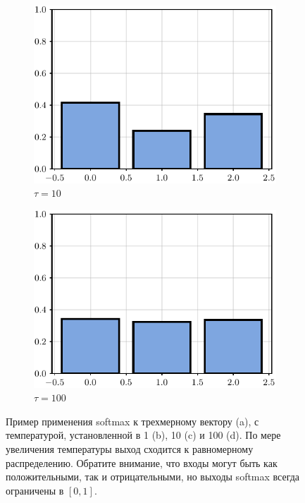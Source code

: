 \begin{figure}[t]
\begin{subfigure}[b]{0.24\textwidth}
    \includegraphics[width=1.0\textwidth]{images/softmax_3.pdf}
    \caption{$\tau=10$}
    \end{subfigure}
    \hfill
    \begin{subfigure}[b]{0.24\textwidth}
    \includegraphics[width=1.0\textwidth]{images/softmax_4.pdf}
    \caption{$\tau=100$}
    \end{subfigure}
    \hfill
    \caption{Пример применения softmax к трехмерному вектору (a), с температурой, установленной в 1 (b), 10 (c) и 100 (d). По мере увеличения температуры выход сходится к равномерному распределению. Обратите внимание, что входы могут быть как положительными, так и отрицательными, но выходы softmax всегда ограничены в $[0,1]$.}
    \label{fig:softmax}
\end{figure}


